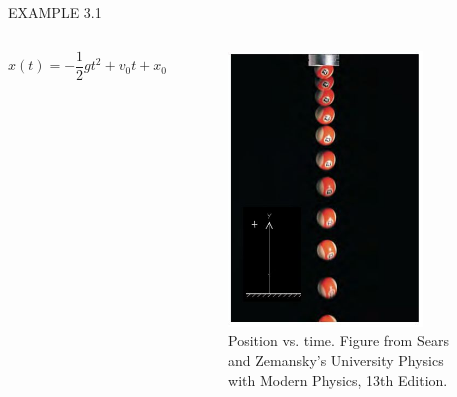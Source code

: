 \documentclass[]{beamer}
\begin{document}
\begin{frame}
EXAMPLE 3.1


\vspace{3mm}

 \begin{columns}[c]
    \column{2in}  %
   
    \begin{equation}
       x(t)=-\frac{1}{2}gt^ 2+v_0t+x_0
        \end{equation}
 
 
    \column{2.5in}
    
    \begin{figure}[h!]  
   \includegraphics[width=0.8\textwidth]{images/1.jpg}
    \caption{Position vs. time. {\tiny Figure from Sears and Zemansky's University Physics 
    with Modern Physics, 13th Edition.} }
 \end{figure}
 
 
 
    \end{columns}
 
\end{frame}


\end{document}
